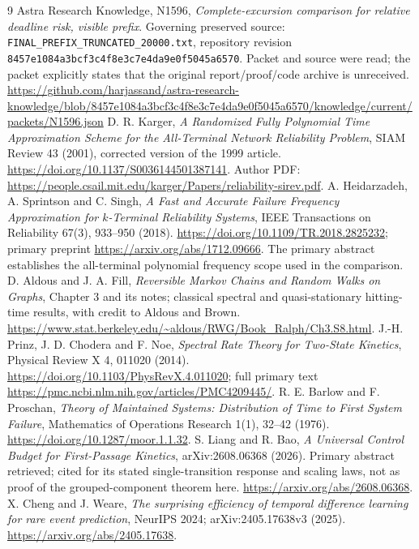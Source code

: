 \documentclass[11pt,a4paper]{article}
\begin{document}
\begin{thebibliography}{9}
 Astra Research Knowledge, N1596, \emph{Complete-excursion comparison for relative deadline risk, visible prefix}. Governing preserved source: \texttt{FINAL\_PREFIX\_TRUNCATED\_20000.txt}, repository revision \texttt{8457e1084a3bcf3c4f8e3c7e4da9e0f5045a6570}. Packet and source were read; the packet explicitly states that the original report/proof/code archive is unreceived. \url{https://github.com/harjassand/astra-research-knowledge/blob/8457e1084a3bcf3c4f8e3c7e4da9e0f5045a6570/knowledge/current/packets/N1596.json}
 D. R. Karger, \emph{A Randomized Fully Polynomial Time Approximation Scheme for the All-Terminal Network Reliability Problem}, SIAM Review 43 (2001), corrected version of the 1999 article. \url{https://doi.org/10.1137/S0036144501387141}. Author PDF: \url{https://people.csail.mit.edu/karger/Papers/reliability-sirev.pdf}.
 A. Heidarzadeh, A. Sprintson and C. Singh, \emph{A Fast and Accurate Failure Frequency Approximation for $k$-Terminal Reliability Systems}, IEEE Transactions on Reliability 67(3), 933--950 (2018). \url{https://doi.org/10.1109/TR.2018.2825232}; primary preprint \url{https://arxiv.org/abs/1712.09666}. The primary abstract establishes the all-terminal polynomial frequency scope used in the comparison.
 D. Aldous and J. A. Fill, \emph{Reversible Markov Chains and Random Walks on Graphs}, Chapter 3 and its notes; classical spectral and quasi-stationary hitting-time results, with credit to Aldous and Brown. \url{https://www.stat.berkeley.edu/~aldous/RWG/Book_Ralph/Ch3.S8.html}.
 J.-H. Prinz, J. D. Chodera and F. Noe, \emph{Spectral Rate Theory for Two-State Kinetics}, Physical Review X 4, 011020 (2014). \url{https://doi.org/10.1103/PhysRevX.4.011020}; full primary text \url{https://pmc.ncbi.nlm.nih.gov/articles/PMC4209445/}.
 R. E. Barlow and F. Proschan, \emph{Theory of Maintained Systems: Distribution of Time to First System Failure}, Mathematics of Operations Research 1(1), 32--42 (1976). \url{https://doi.org/10.1287/moor.1.1.32}.
 S. Liang and R. Bao, \emph{A Universal Control Budget for First-Passage Kinetics}, arXiv:2608.06368 (2026). Primary abstract retrieved; cited for its stated single-transition response and scaling laws, not as proof of the grouped-component theorem here. \url{https://arxiv.org/abs/2608.06368}.
 X. Cheng and J. Weare, \emph{The surprising efficiency of temporal difference learning for rare event prediction}, NeurIPS 2024; arXiv:2405.17638v3 (2025). \url{https://arxiv.org/abs/2405.17638}.
\end{thebibliography}
\end{document}
